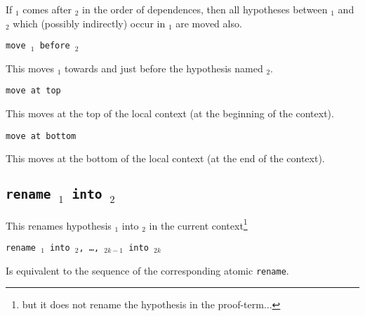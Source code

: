 If {\ident$_1$} comes after {\ident$_2$} in the order of dependences,
then all hypotheses between {\ident$_1$} and {\ident$_2$} which 
(possibly indirectly) occur in {\ident$_1$} are moved also.

\begin{Variants}

\item {\tt move {\ident$_1$} before {\ident$_2$}}

This moves {\ident$_1$} towards and just before the hypothesis named {\ident$_2$}.

\item {\tt move {\ident} at top}

This moves {\ident} at the top of the local context (at the beginning of the context).

\item {\tt move {\ident} at bottom}

This moves {\ident} at the bottom of the local context (at the end of the context).

\end{Variants}

\begin{ErrMsgs}

\item {}

\item {}

\item {}

\end{ErrMsgs}

\subsection{\tt rename {\ident$_1$} into {\ident$_2$}
}

This renames hypothesis {\ident$_1$} into {\ident$_2$} in the current
context\footnote{but it does not rename the hypothesis in the
  proof-term...}

\begin{Variants}

\item {\tt rename {\ident$_1$} into {\ident$_2$}, \ldots,
    {\ident$_{2k-1}$} into {\ident$_{2k}$}}

 Is equivalent to the sequence of the corresponding atomic {\tt rename}. 

\end{Variants}

